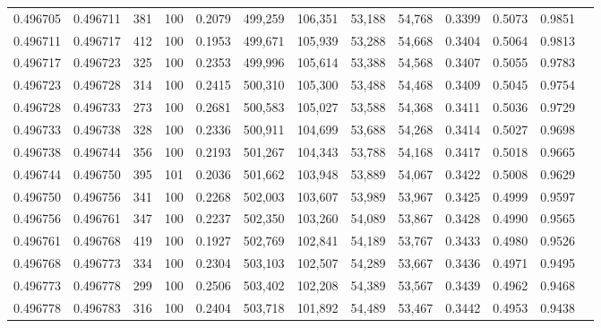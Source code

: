 \begin{tabular}{rrrrrrrrrrrrr}
0.496705 & 0.496711 &   381 & 100 &                                     0.2079 & 499,259 & 106,351 &  53,188 &  54,768 & 0.3399 & 0.5073 & 0.9851 \\
0.496711 & 0.496717 &   412 & 100 &                                     0.1953 & 499,671 & 105,939 &  53,288 &  54,668 & 0.3404 & 0.5064 & 0.9813 \\
0.496717 & 0.496723 &   325 & 100 &                                     0.2353 & 499,996 & 105,614 &  53,388 &  54,568 & 0.3407 & 0.5055 & 0.9783 \\
0.496723 & 0.496728 &   314 & 100 &                                     0.2415 & 500,310 & 105,300 &  53,488 &  54,468 & 0.3409 & 0.5045 & 0.9754 \\
0.496728 & 0.496733 &   273 & 100 &                                     0.2681 & 500,583 & 105,027 &  53,588 &  54,368 & 0.3411 & 0.5036 & 0.9729 \\
0.496733 & 0.496738 &   328 & 100 &                                     0.2336 & 500,911 & 104,699 &  53,688 &  54,268 & 0.3414 & 0.5027 & 0.9698 \\
0.496738 & 0.496744 &   356 & 100 &                                     0.2193 & 501,267 & 104,343 &  53,788 &  54,168 & 0.3417 & 0.5018 & 0.9665 \\
0.496744 & 0.496750 &   395 & 101 &                                     0.2036 & 501,662 & 103,948 &  53,889 &  54,067 & 0.3422 & 0.5008 & 0.9629 \\
0.496750 & 0.496756 &   341 & 100 &                                     0.2268 & 502,003 & 103,607 &  53,989 &  53,967 & 0.3425 & 0.4999 & 0.9597 \\
0.496756 & 0.496761 &   347 & 100 &                                     0.2237 & 502,350 & 103,260 &  54,089 &  53,867 & 0.3428 & 0.4990 & 0.9565 \\
0.496761 & 0.496768 &   419 & 100 &                                     0.1927 & 502,769 & 102,841 &  54,189 &  53,767 & 0.3433 & 0.4980 & 0.9526 \\
0.496768 & 0.496773 &   334 & 100 &                                     0.2304 & 503,103 & 102,507 &  54,289 &  53,667 & 0.3436 & 0.4971 & 0.9495 \\
0.496773 & 0.496778 &   299 & 100 &                                     0.2506 & 503,402 & 102,208 &  54,389 &  53,567 & 0.3439 & 0.4962 & 0.9468 \\
0.496778 & 0.496783 &   316 & 100 &                                     0.2404 & 503,718 & 101,892 &  54,489 &  53,467 & 0.3442 & 0.4953 & 0.9438 \\

\end{tabular}
